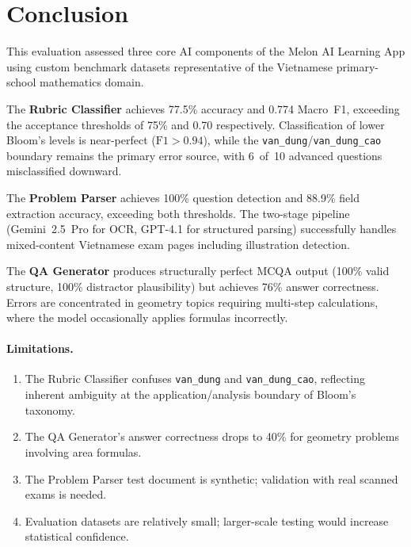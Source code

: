 \documentclass[12pt, a4paper]{article}
\begin{document}
\section{Conclusion}
\label{sec:conclusion}

This evaluation assessed three core AI components of the Melon AI Learning App using custom benchmark datasets representative of the Vietnamese primary-school mathematics domain.

The \textbf{Rubric Classifier} achieves 77.5\% accuracy and 0.774 Macro~F1, exceeding the acceptance thresholds of 75\% and 0.70 respectively. Classification of lower Bloom's levels is near-perfect ($\text{F1} > 0.94$), while the \texttt{van\_dung}/\texttt{van\_dung\_cao} boundary remains the primary error source, with 6~of~10 advanced questions misclassified downward.

The \textbf{Problem Parser} achieves 100\% question detection and 88.9\% field extraction accuracy, exceeding both thresholds. The two-stage pipeline (Gemini~2.5~Pro for OCR, GPT-4.1 for structured parsing) successfully handles mixed-content Vietnamese exam pages including illustration detection.

The \textbf{QA Generator} produces structurally perfect MCQA output (100\% valid structure, 100\% distractor plausibility) but achieves 76\% answer correctness. Errors are concentrated in geometry topics requiring multi-step calculations, where the model occasionally applies formulas incorrectly.

\paragraph{Limitations.}
\begin{enumerate}[nosep]
    \item The Rubric Classifier confuses \texttt{van\_dung} and \texttt{van\_dung\_cao}, reflecting inherent ambiguity at the application/analysis boundary of Bloom's taxonomy.
    \item The QA Generator's answer correctness drops to 40\% for geometry problems involving area formulas.
    \item The Problem Parser test document is synthetic; validation with real scanned exams is needed.
    \item Evaluation datasets are relatively small; larger-scale testing would increase statistical confidence.
\end{enumerate}
\end{document}
